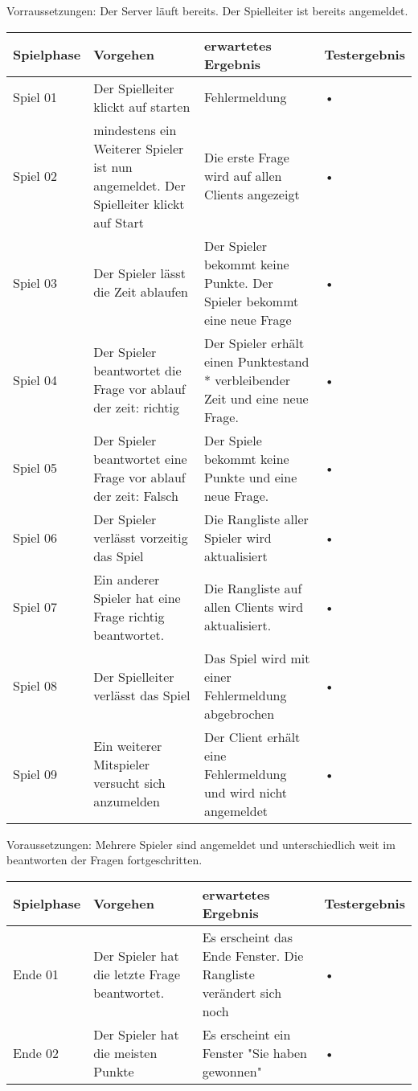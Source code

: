 \documentclass[a4paper,15pt]{article}
\begin{document}
Vorraussetzungen: Der Server läuft bereits. Der Spielleiter ist bereits angemeldet.
\newline
\begin{tabular}{|l|p{5cm}|p{5cm}|l|}
\hline Spielphase & Vorgehen & erwartetes Ergebnis & Testergebnis \\ 
\hline Spiel 01 & Der Spielleiter klickt auf starten & Fehlermeldung & • \\ 
\hline Spiel 02 & mindestens ein Weiterer Spieler ist nun angemeldet. Der Spielleiter klickt auf Start & Die erste Frage wird auf allen Clients angezeigt & • \\ 
\hline Spiel 03 & Der Spieler lässt die Zeit ablaufen & Der Spieler bekommt keine Punkte. Der Spieler bekommt eine neue Frage & • \\ 
\hline Spiel 04 & Der Spieler beantwortet die Frage vor ablauf der zeit: richtig & Der Spieler erhält einen Punktestand * verbleibender Zeit und eine neue Frage. & • \\ 
\hline Spiel 05 & Der Spieler beantwortet eine Frage vor ablauf der zeit: Falsch & Der Spiele bekommt keine Punkte und eine neue Frage. & • \\ 
\hline Spiel 06 & Der Spieler verlässt vorzeitig das Spiel & Die Rangliste aller Spieler wird aktualisiert & • \\ 
\hline Spiel 07 & Ein anderer Spieler hat eine Frage richtig beantwortet. & Die Rangliste auf allen Clients wird aktualisiert. & • \\ 
\hline Spiel 08 & Der Spielleiter verlässt das Spiel & Das Spiel wird mit einer Fehlermeldung abgebrochen & • \\ 
\hline Spiel 09 & Ein weiterer Mitspieler versucht sich anzumelden & Der Client erhält eine Fehlermeldung und wird nicht angemeldet & • \\ 
\hline 
\end{tabular} 
\newline
Voraussetzungen: Mehrere Spieler sind angemeldet und unterschiedlich weit im beantworten der Fragen fortgeschritten.
\newline
\begin{tabular}{|l|p{5cm}|p{5cm}|l|}
\hline Spielphase & Vorgehen & erwartetes Ergebnis & Testergebnis \\ 
\hline Ende 01 & Der Spieler hat die letzte Frage beantwortet. & Es erscheint das Ende Fenster. Die Rangliste verändert sich noch & • \\ 
\hline Ende 02 & Der Spieler hat die meisten Punkte & Es erscheint ein Fenster "Sie haben gewonnen" & • \\ 
\hline 
\end{tabular} 
\end{document}
